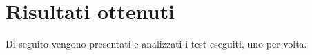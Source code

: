 \section{Risultati ottenuti} \label{ris_ottenuti}
Di seguito vengono presentati e analizzati i test eseguiti, uno per volta.



